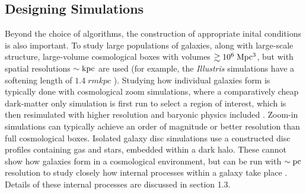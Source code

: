 \subsection{Designing Simulations}
Beyond the choice of algorithms, the construction of appropriate inital
conditions is also important.  To study large populations of galaxies, along
with large-scale structure, large-volume cosmological boxes with volumes
$\gtrsim 10^6\;\rm{Mpc^3}$, but with spatial resolutions $\sim \rm{kpc}$ are
used (for example, the {\it Illustris} simulations have a softening length of
$1.4\;rm{kpc}$ \citealt{Vogelsberger2014}).  Studying how individual galaxies
form is typically done with cosmological zoom simulations, where a comparatively
cheap dark-matter only simulation is first run to select a region of interest,
which is then resimulated with higher resolution and baryonic physics included
\citep{Navarro1993}. Zoom-in simulations can typically achieve an order of
magnitude or better resolution than full cosmological boxes.  Isolated galaxy
disc simulations use a constructed disc profiles containing gas and stars,
embedded within a dark halo. These cannot show how galaxies form in a
cosmological environment, but can be run with $\sim \rm{pc}$ resolution to study
closely how internal processes within a galaxy take place
\citep{Hopkins2011,Benincasa2016}.  Details of these internal processes are
discussed in section 1.3.

